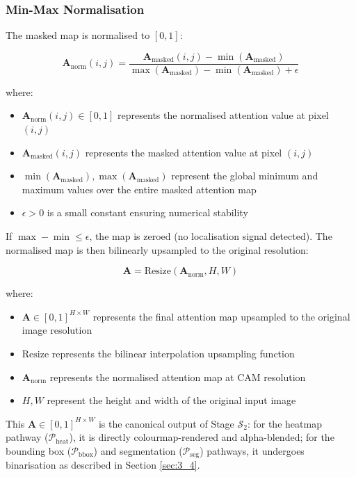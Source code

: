\subsubsection{Min-Max Normalisation}

The masked map is normalised to $[0, 1]$:

$$
\mathbf{A}_{\text{norm}}(i,j) = \frac{\mathbf{A}_{\text{masked}}(i,j) - \min(\mathbf{A}_{\text{masked}})}{\max(\mathbf{A}_{\text{masked}}) - \min(\mathbf{A}_{\text{masked}}) + \epsilon}
$$

where:
\begin{itemize}
\item $\mathbf{A}_{\text{norm}}(i,j) \in [0,1]$ represents the normalised attention value at pixel $(i,j)$
\item $\mathbf{A}_{\text{masked}}(i,j)$ represents the masked attention value at pixel $(i,j)$
\item $\min(\mathbf{A}_{\text{masked}}), \max(\mathbf{A}_{\text{masked}})$ represent the global minimum and maximum values over the entire masked attention map
\item $\epsilon > 0$ is a small constant ensuring numerical stability
\end{itemize}

If $\max - \min \leq \epsilon$, the map is zeroed (no localisation signal detected). The normalised map is then bilinearly upsampled to the original resolution:

$$
\mathbf{A} = \text{Resize}(\mathbf{A}_{\text{norm}}, H, W)
$$

where:
\begin{itemize}
\item $\mathbf{A} \in [0,1]^{H \times W}$ represents the final attention map upsampled to the original image resolution
\item $\text{Resize}$ represents the bilinear interpolation upsampling function
\item $\mathbf{A}_{\text{norm}}$ represents the normalised attention map at CAM resolution
\item $H, W$ represent the height and width of the original input image
\end{itemize}

This $\mathbf{A} \in [0, 1]^{H \times W}$ is the canonical output of Stage $\mathcal{S}_2$: for the heatmap pathway ($\mathcal{P}_{\text{heat}}$), it is directly colourmap-rendered and alpha-blended; for the bounding box ($\mathcal{P}_{\text{bbox}}$) and segmentation ($\mathcal{P}_{\text{seg}}$) pathways, it undergoes binarisation as described in Section \ref{sec:3_4}.

